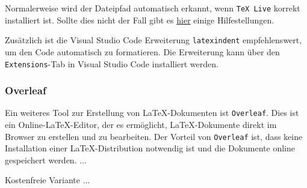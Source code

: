 Normalerweise wird der Dateipfad automatisch erkannt, wenn \texttt{TeX Live} korrekt installiert ist. Sollte dies nicht der Fall gibt es \href{https://github.com/James-Yu/LaTeX-Workshop/wiki/Install#setting-path-environment-variable}{hier} einige Hilfestellungen.

Zusätzlich ist die Visual Studio Code Erweiterung \texttt{latexindent} empfehlenswert, um den Code automatisch zu formatieren. Die Erweiterung kann über den \texttt{Extensions}-Tab in Visual Studio Code installiert werden.


\subsubsection{Overleaf}
\label{sec:overleaf}
Ein weiteres Tool zur Erstellung von \LaTeX{}-Dokumenten ist \texttt{Overleaf}. Dies ist ein Online-\LaTeX{}-Editor, der es ermöglicht, \LaTeX{}-Dokumente direkt im Browser zu erstellen und zu bearbeiten. Der Vorteil von \texttt{Overleaf} ist, dass keine Installation einer \LaTeX{}-Distribution notwendig ist und die Dokumente online gespeichert werden. ...

Kostenfreie Variante ...









\newpage